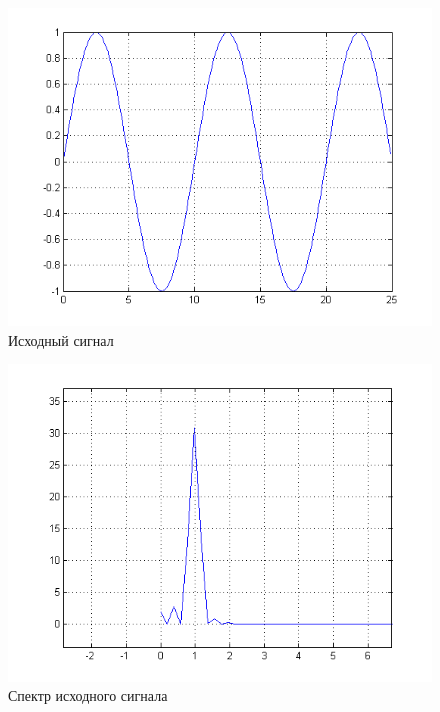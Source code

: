 \begin{figure}[H]
   \includegraphics[scale=0.7]{lab7/src_signal.png}
   \caption{Исходный сигнал}
\end{figure}

\begin{figure}[H]
   \includegraphics[scale=0.7]{lab7/src_signal_spectro.png}
   \caption{Спектр исходного сигнала}
\end{figure}

